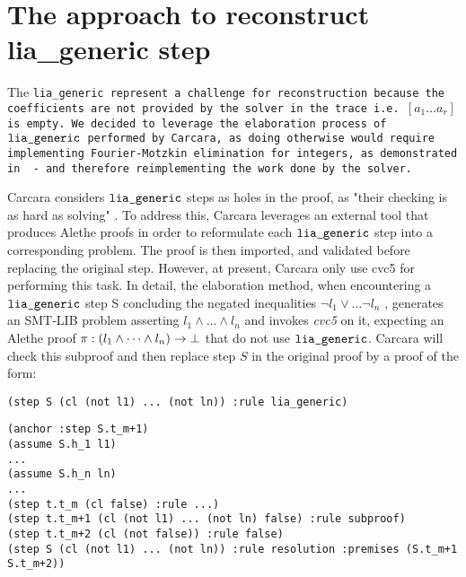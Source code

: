 \section{The approach to reconstruct lia\_generic step}
\label{sec:elaboration-lia}

The \tt{lia\_generic} represent a challenge for reconstruction because the coefficients are not provided by the solver in the trace i.e. \colorbox{orange!30}{$[a_1 \dots a_r]$} is empty.
We decided to leverage the elaboration process of $\tt{lia\_generic}$ performed by Carcara, as doing otherwise would require implementing Fourier-Motzkin elimination for integers, as demonstrated in \cite{omegatest,micromega} -
and therefore reimplementing the work done by the solver.

Carcara considers $\tt{lia\_generic}$ steps as holes in the proof,  as "their checking is as hard as solving" \cite[\S 3.2]{carcara}.
To address this, Carcara leverages an external tool that produces Alethe proofs in order to reformulate each $\tt{lia\_generic}$ step into a corresponding problem. 
The proof is then imported, and validated before replacing the original step. However, at present, Carcara only use cvc5 for performing this task.
In detail, the elaboration method, when encountering a $\tt{lia\_generic}$ step S concluding the negated inequalities $ \neg l_1 \lor \dots \neg l_n$ , generates an SMT-LIB problem asserting $l_1 \land \dots \land l_n$ and invokes \emph{cvc5} on it, expecting an Alethe proof $\pi : (l_1 \land \dots \land l_n) \ra \bot$
that do not use $\tt{lia\_generic}$. Carcara will check this subproof and then replace step $S$ in the original proof by a proof of the form:

\begin{lstlisting}[language=SMT]
(step S (cl (not l1) ... (not ln)) :rule lia_generic)
\end{lstlisting}

\begin{center}
\lightning
\end{center}

\begin{lstlisting}[language=SMT,caption={Elaboration of $\tt{lia\_generic}$},label={lst:elab_lia}]
(anchor :step S.t_m+1)
(assume S.h_1 l1)
...
(assume S.h_n ln)
...
(step t.t_m (cl false) :rule ...)
(step t.t_m+1 (cl (not l1) ... (not ln) false) :rule subproof)
(step t.t_m+2 (cl (not false)) :rule false)
(step S (cl (not l1) ... (not ln)) :rule resolution :premises (S.t_m+1 S.t_m+2))
\end{lstlisting}

